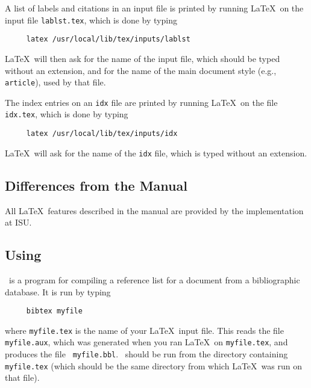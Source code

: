 A list of labels and citations in an input file is printed
by running \LaTeX\ on the input file \mbox{\tt lablst.tex},
which is done by typing
\begin{verbatim}
     latex /usr/local/lib/tex/inputs/lablst
\end{verbatim}
\LaTeX\ will then ask for the name of the input file, which should be
typed without an extension, and for the name of the main document style
(e.g., \mbox{\tt article}), used by that file.

The index entries on an {\tt idx} file are printed by running \LaTeX\
on the file \mbox{\tt idx.tex}, which is done by typing
\begin{verbatim}
     latex /usr/local/lib/tex/inputs/idx
\end{verbatim}
\LaTeX\ will ask for the name of the {\tt idx} file, which is typed
without an extension.



\subsection{Differences from the Manual}

All \LaTeX\ features described in the manual are provided by 
the implementation at ISU.





\subsection{Using \BibTeX}

\BibTeX\ is a program for compiling a reference list for a document
from a bibliographic database.  It is run by typing
\begin{verbatim}
     bibtex myfile
\end{verbatim}
where \mbox{\tt myfile.tex} is the name of your \LaTeX\ input file.
This reads the file \mbox{\tt myfile.aux}, which was generated when you
ran \LaTeX\ on \mbox{\tt myfile.tex}, and produces the file \mbox{\tt
myfile.bbl}.  \BibTeX\ should be run from the directory containing
\mbox{\tt myfile.tex} (which should be the same directory from which
\LaTeX\ was run on that file).

